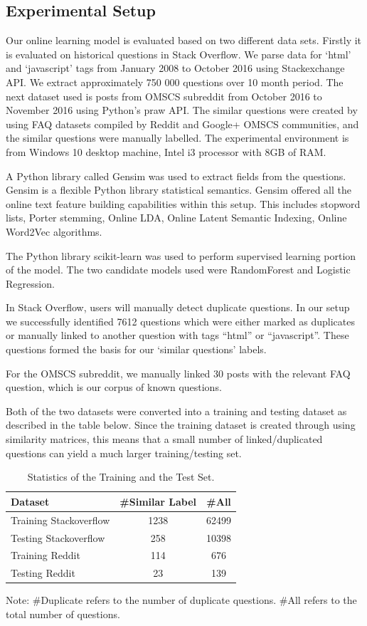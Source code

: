 \documentclass[journal,12pt,onecolumn,draftclsnofoot,]{IEEEtran}
\begin{document}
\subsection{Experimental Setup}

Our online learning model is evaluated based on two different data sets. Firstly it is evaluated on historical questions in Stack Overflow. We parse data for `html' and `javascript' tags from January 2008 to October 2016 using Stackexchange API. We extract approximately 750 000 questions over 10 month period. The next dataset used is posts from OMSCS subreddit from October 2016 to November 2016 using Python's praw API. The similar questions were created by using FAQ datasets compiled by Reddit and Google+ OMSCS communities, and the similar questions were manually labelled. The experimental environment is from Windows 10 desktop machine, Intel i3 processor with 8GB of RAM.

A Python library called Gensim was used to extract fields from the questions. Gensim is a flexible Python library statistical semantics. Gensim offered all the online text feature building capabilities within this setup. This includes stopword lists, Porter stemming, Online LDA, Online Latent Semantic Indexing, Online Word2Vec algorithms.

The Python library scikit-learn was used to perform supervised learning portion of the model. The two candidate models used were RandomForest and Logistic Regression.

In Stack Overflow, users will manually detect duplicate questions. In our setup we successfully identified 7612 questions which were either marked as duplicates or manually linked to another question with tags ``html'' or ``javascript''. These questions formed the basis for our `similar questions' labels.

For the OMSCS subreddit, we manually linked 30 posts with the relevant FAQ question, which is our corpus of known questions.

Both of the two datasets were converted into a training and testing dataset as described in the table below. Since the training dataset is created through using similarity matrices, this means that a small number of linked/duplicated questions can yield a much larger training/testing set.

\begin{table}[h!]
\centering
\caption{Statistics of the Training and the Test Set.}
 \begin{tabular}{|l c c |}
 \hline
 Dataset & \#Similar Label & \#All \\ [0.5ex]
 \hline\hline
 Training Stackoverflow & 1238 & 62499 \\
 \hline
 Testing Stackoverflow & 258 & 10398  \\
 \hline
 Training Reddit & 114 &   676 \\
 \hline
 Testing Reddit & 23 & 139  \\
 \hline
\end{tabular}

\hfill \break

Note: \#Duplicate refers to the number of duplicate questions. \#All refers to the total number of questions.
\end{table}
\end{document}
